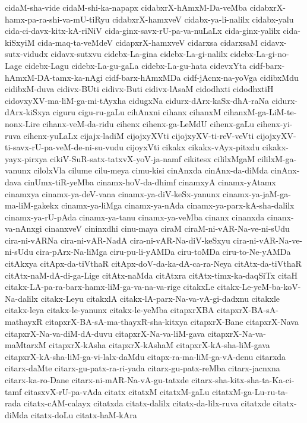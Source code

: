 {cidaM-sha-vide
cidaM-shi-ka-napapx
cidabxrX-hAmxM-Da-veMba
cidabxrX-hamx-pa-ra-shi-va-mU-tiRyu
cidabxrX-hamxveV
cidabx-ya-li-nalilx
cidabx-yalu
cida-ci-davx-kitx-kA-riNiV
cida-ginx-savx-rU-pa-va-nuLaLx
cida-ginx-yalilx
cida-kiSxyiM
cida-maq-ta-veMdeV
cidapxrX-hamxveV
cidarxsa
cidarxsaM
cidavx-sutx-vidudx
cidavx-sutxvu
cidebx-La-gina
cidebx-La-gi-nalilx
cidebx-La-gi-no-Lage
cidebx-Lagu
cidebx-La-gu-gaLa
cidebx-La-gu-hata
cidevxYta
cidf-barx-hAmxM-DA-tamx-ka-nAgi
cidf-barx-hAmxMDa
cidf-jAcnx-na-yoVga
cidibxMdu
cidibxM-duva
cidivx-BUti
cidivx-Buti
cidivx-lAsaM
cidodhxti
cidodhxtiH
cidovxyXV-ma-liM-ga-mi-tAyxha
cidugxNa
cidurx-dArx-kaSx-dhA-raNa
cidurx-dArx-kiSxya
ciguru
cigu-ru-gaLu
cihAnxni
cihanx
cihanxM
cihanxM-ga-LiM-te-nonx-Lire
cihanx-veM-da-ridu
cihenx
cihenx-ga-LeMdU
cihenx-gaLu
cihenx-yi-ruva
cihenx-yuLaLx
cijajx-ladiM
cijojxyXVti
cijojxyXV-ti-reV-veVti
cijojxyXV-ti-savx-rU-pa-veM-de-ni-su-vudu
cijoyxVti
cikakx
cikakx-vAyx-pitxdu
cikakx-yayx-pirxya
cikiV-SuR-satx-tatxvX-yoV-ja-namf
cikitesx
cililxMgaM
cililxM-ga-vanunx
cilolxVla
cilume
cilu-meya
cimu-kisi
cinAnxda
cinAnx-da-diMda
cinAnx-dava
cinUmx-tiR-yeMba
cinamx-hoV-da-dhimf
cinamxyA
cinamx-yAtamx
cinamxya
cinamx-ya-deV-vana
cinamx-ya-diV-keSx-yanunx
cinamx-ya-jaM-ga-ma-liM-gakekx
cinamx-ya-liMga
cinamx-ya-nAda
cinamx-ya-parx-kA-sha-dalilx
cinamx-ya-rU-pAda
cinamx-ya-tanu
cinamx-ya-veMba
cinanx
cinanxda
cinanx-va-nAnxgi
cinanxveV
cininxdhi
cinu-maya
ciraM
ciraM-ni-vAR-Na-ve-ni-sUdu
cira-ni-vARNa
cira-ni-vAR-NadA
cira-ni-vAR-Na-diV-keSxyu
cira-ni-vAR-Na-ve-ni-sUdu
cira-pArx-Na-liMga
ciru-pu-li-yAMDa
ciru-toMDa
ciru-to-Ne-yAMDa
citAkxya
citApx-da-tiVthaR
citApx-doV-da-ka-dA-ca-ra-Neya
citAtx-da-tiVthaR
citAtx-naM-dA-di-ga-Lige
citAtx-naMda
citAtxra
citAtx-timx-ka-daqSiTx
citaH
citakx-LA-pa-ra-barx-hamx-liM-ga-va-na-va-rige
citakxLe
citakx-Le-yeM-ba-koV-Na-dalilx
citakx-Leyu
citakxlA
citakx-lA-parx-Na-va-vA-gi-dadxnu
citakxle
citakx-leya
citakx-le-yanunx
citakx-le-yeMba
citapxrXBA
citapxrX-BA-sA-mathayxR
citapxrX-BA-sA-ma-thayxR-sha-kitxya
citapxrX-Bane
citapxrX-Nava
citapxrX-Na-va-diM-dA-duvu
citapxrX-Na-va-liM-gava
citapxrX-Na-va-maMtarxM
citapxrX-kAsha
citapxrX-kAshaM
citapxrX-kA-sha-liM-gava
citapxrX-kA-sha-liM-ga-vi-lalx-daMdu
citapx-ra-ma-liM-ga-vA-denu
citarxda
citarx-daMte
citarx-gu-patx-ra-ri-yada
citarx-gu-patx-reMba
citarx-jacnxna
citarx-ka-ro-Dane
citarx-ni-mAR-Na-vA-gu-tatxde
citarx-sha-kitx-sha-ta-Ka-ci-tamf
citasxvX-rU-pa-vAda
citatx
citatxM
citatxM-gaLu
citatxM-ga-Lu-ru-ta-rada
citatx-cAM-calayx
citatxda
citatx-dalilx
citatx-da-lilx-ruva
citatxde
citatx-diMda
citatx-doLu
citatx-haM-kAra
}
